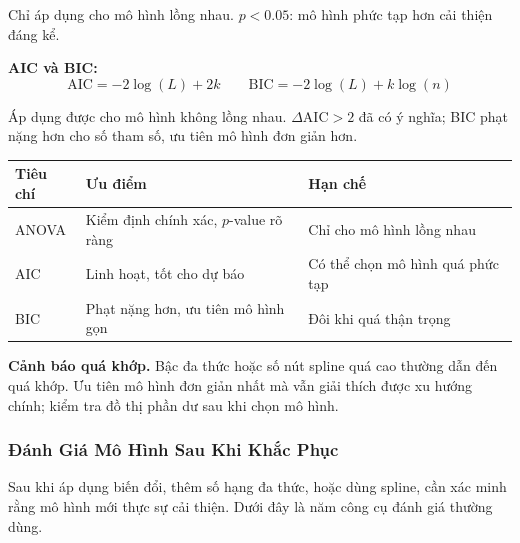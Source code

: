 \documentclass[12pt, a4paper]{article}
\begin{document}
Chỉ áp dụng cho mô hình lồng nhau. $p < 0.05$: mô hình phức tạp hơn cải thiện đáng kể.

\textbf{AIC và BIC:}
\[
  \text{AIC} = -2\log(L) + 2k
  \qquad
  \text{BIC} = -2\log(L) + k\log(n)
\]

Áp dụng được cho mô hình không lồng nhau. $\Delta\text{AIC} > 2$ đã có ý nghĩa; BIC phạt nặng hơn cho số tham số, ưu tiên mô hình đơn giản hơn.

\begin{center}
\begin{tabular}{@{}lll@{}}
\toprule
\textbf{Tiêu chí} & \textbf{Ưu điểm} & \textbf{Hạn chế} \\
\midrule
ANOVA & Kiểm định chính xác, $p$-value rõ ràng & Chỉ cho mô hình lồng nhau \\
AIC   & Linh hoạt, tốt cho dự báo              & Có thể chọn mô hình quá phức tạp \\
BIC   & Phạt nặng hơn, ưu tiên mô hình gọn     & Đôi khi quá thận trọng \\
\bottomrule
\end{tabular}
\end{center}

\textbf{Cảnh báo quá khớp.} Bậc đa thức hoặc số nút spline quá cao thường dẫn đến quá khớp. Ưu tiên mô hình đơn giản nhất mà vẫn giải thích được xu hướng chính; kiểm tra đồ thị phần dư sau khi chọn mô hình.

\subsubsection{Đánh Giá Mô Hình Sau Khi Khắc Phục}

Sau khi áp dụng biến đổi, thêm số hạng đa thức, hoặc dùng spline, cần xác minh rằng mô hình mới thực sự cải thiện. Dưới đây là năm công cụ đánh giá thường dùng.
\end{document}
